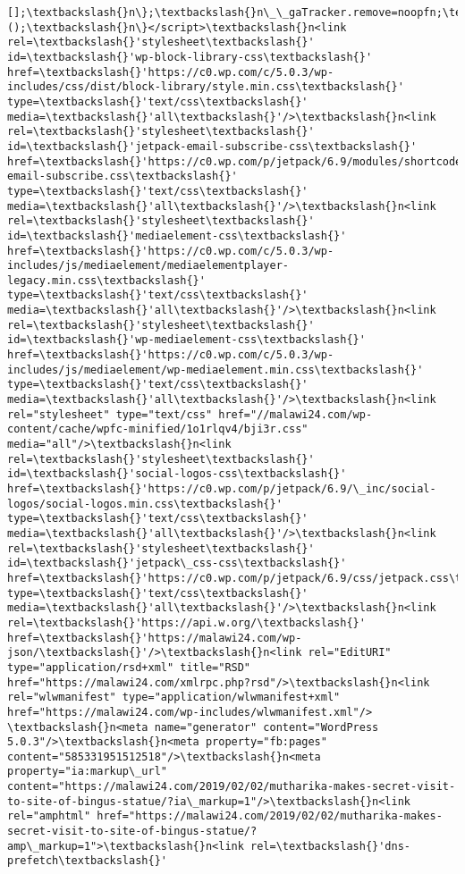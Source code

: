 \documentclass[11pt]{article}
\begin{document}
\begin{Verbatim}[commandchars=\\\{\}]
[];\textbackslash{}n\};\textbackslash{}n\_\_gaTracker.remove=noopfn;\textbackslash{}nwindow[\textbackslash{}'\_\_gaTracker\textbackslash{}']=\_\_gaTracker;\textbackslash{}n\})();\textbackslash{}n\}</script>\textbackslash{}n<link rel=\textbackslash{}'stylesheet\textbackslash{}' id=\textbackslash{}'wp-block-library-css\textbackslash{}' href=\textbackslash{}'https://c0.wp.com/c/5.0.3/wp-includes/css/dist/block-library/style.min.css\textbackslash{}' type=\textbackslash{}'text/css\textbackslash{}' media=\textbackslash{}'all\textbackslash{}'/>\textbackslash{}n<link rel=\textbackslash{}'stylesheet\textbackslash{}' id=\textbackslash{}'jetpack-email-subscribe-css\textbackslash{}' href=\textbackslash{}'https://c0.wp.com/p/jetpack/6.9/modules/shortcodes/css/jetpack-email-subscribe.css\textbackslash{}' type=\textbackslash{}'text/css\textbackslash{}' media=\textbackslash{}'all\textbackslash{}'/>\textbackslash{}n<link rel=\textbackslash{}'stylesheet\textbackslash{}' id=\textbackslash{}'mediaelement-css\textbackslash{}' href=\textbackslash{}'https://c0.wp.com/c/5.0.3/wp-includes/js/mediaelement/mediaelementplayer-legacy.min.css\textbackslash{}' type=\textbackslash{}'text/css\textbackslash{}' media=\textbackslash{}'all\textbackslash{}'/>\textbackslash{}n<link rel=\textbackslash{}'stylesheet\textbackslash{}' id=\textbackslash{}'wp-mediaelement-css\textbackslash{}' href=\textbackslash{}'https://c0.wp.com/c/5.0.3/wp-includes/js/mediaelement/wp-mediaelement.min.css\textbackslash{}' type=\textbackslash{}'text/css\textbackslash{}' media=\textbackslash{}'all\textbackslash{}'/>\textbackslash{}n<link rel="stylesheet" type="text/css" href="//malawi24.com/wp-content/cache/wpfc-minified/1o1rlqv4/bji3r.css" media="all"/>\textbackslash{}n<link rel=\textbackslash{}'stylesheet\textbackslash{}' id=\textbackslash{}'social-logos-css\textbackslash{}' href=\textbackslash{}'https://c0.wp.com/p/jetpack/6.9/\_inc/social-logos/social-logos.min.css\textbackslash{}' type=\textbackslash{}'text/css\textbackslash{}' media=\textbackslash{}'all\textbackslash{}'/>\textbackslash{}n<link rel=\textbackslash{}'stylesheet\textbackslash{}' id=\textbackslash{}'jetpack\_css-css\textbackslash{}' href=\textbackslash{}'https://c0.wp.com/p/jetpack/6.9/css/jetpack.css\textbackslash{}' type=\textbackslash{}'text/css\textbackslash{}' media=\textbackslash{}'all\textbackslash{}'/>\textbackslash{}n<link rel=\textbackslash{}'https://api.w.org/\textbackslash{}' href=\textbackslash{}'https://malawi24.com/wp-json/\textbackslash{}'/>\textbackslash{}n<link rel="EditURI" type="application/rsd+xml" title="RSD" href="https://malawi24.com/xmlrpc.php?rsd"/>\textbackslash{}n<link rel="wlwmanifest" type="application/wlwmanifest+xml" href="https://malawi24.com/wp-includes/wlwmanifest.xml"/> \textbackslash{}n<meta name="generator" content="WordPress 5.0.3"/>\textbackslash{}n<meta property="fb:pages" content="585331951512518"/>\textbackslash{}n<meta property="ia:markup\_url" content="https://malawi24.com/2019/02/02/mutharika-makes-secret-visit-to-site-of-bingus-statue/?ia\_markup=1"/>\textbackslash{}n<link rel="amphtml" href="https://malawi24.com/2019/02/02/mutharika-makes-secret-visit-to-site-of-bingus-statue/?amp\_markup=1">\textbackslash{}n<link rel=\textbackslash{}'dns-prefetch\textbackslash{}' 
\end{Verbatim}
\end{document}

